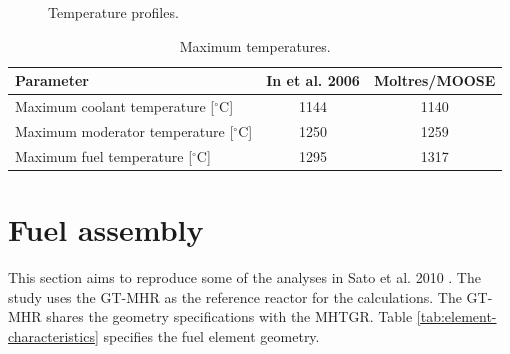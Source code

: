 \begin{figure}[htbp!]
  \centering
  \hfill
    \caption{Temperature profiles.}
  \label{fig:th-val-unit-temps}
\end{figure}

\begin{table}[htbp!]
\centering
      \caption{Maximum temperatures.}
      \label{tab:th-val-unit-results}
    \begin{tabular}{@{}l c c}
    \toprule
  Parameter   & In et al. 2006 \cite{in_three-dimensional_2006} & Moltres/MOOSE \\
    \midrule
  Maximum coolant temperature [$^{\circ}$C]   & 1144 & 1140 \\
  Maximum moderator temperature [$^{\circ}$C] & 1250 & 1259 \\
  Maximum fuel temperature [$^{\circ}$C]      & 1295 & 1317 \\
    \bottomrule
  \end{tabular}
\end{table}

\section{Fuel assembly}

This section aims to reproduce some of the analyses in Sato et al. 2010 \cite{sato_computational_2010}.
The study uses the GT-MHR as the reference reactor for the calculations.
The GT-MHR shares the geometry specifications with the MHTGR.
Table \ref{tab:element-characteristics} specifies the fuel element geometry.

